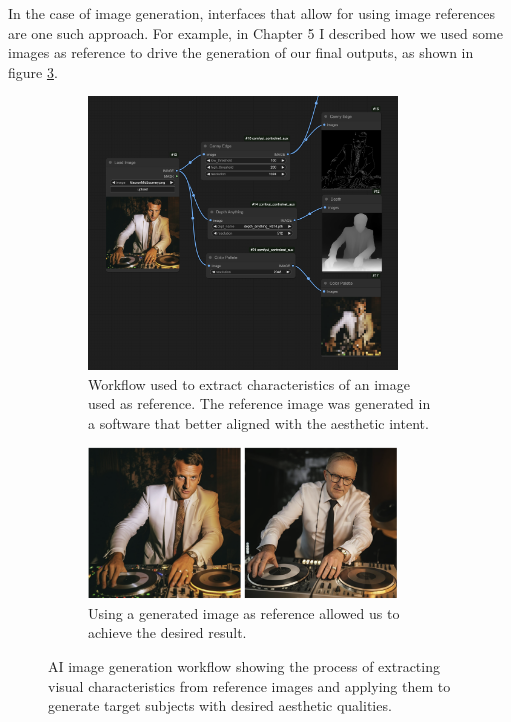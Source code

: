 In the case of image generation, interfaces that allow for using image references are one such approach. For example, in Chapter 5 I described how we used some images as reference to drive the generation of our final outputs, as shown in figure \ref{fig:ai_generation_workflow}.

\begin{figure}[htbp]
    \centering

    \begin{subfigure}[b]{\textwidth}
        \centering
        \includegraphics[width=0.9\textwidth]{controlnetworkflow.png}
        \caption{Workflow used to extract characteristics of an image used as reference. The reference image was generated in a software that better aligned with the aesthetic intent.}
        \label{fig:controlnetworkflow}
    \end{subfigure}


    \begin{subfigure}[b]{\textwidth}
        \centering
        \includegraphics[width=0.9\textwidth]{inputoutput.png}
        \caption{Using a generated image as reference allowed us to achieve the desired result.}
        \label{fig:inputoutput}
    \end{subfigure}

    \caption{AI image generation workflow showing the process of extracting visual characteristics from reference images and applying them to generate target subjects with desired aesthetic qualities.}
    \label{fig:ai_generation_workflow}
\end{figure}

